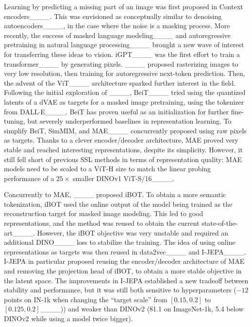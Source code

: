 Learning by predicting a missing part of an image was first proposed in Context encoders____.
This was envisioned as conceptually similar to denoising autoencoders____, in the case where the noise is a masking process.
More recently, the success of masked language modeling____ and autoregressive pretraining in natural language processing____ brought a new wave of interest for transferring these ideas to vision.
iGPT____ was the first effort to train a transformer____ by generating pixels.
____ proposed rasterizing images to very low resolution, then training for autoregressive next-token prediction.
Then, the advent of the ViT____ architecture sparked further interest in the field.
Following the initial exploration of ____, BeiT____ tried using the quantized latents of a dVAE as targets for a masked image pretraining, using the tokenizer from DALL$\cdot$E____.
BeiT has proven useful as an initialization for further fine-tuning, but severely underperformed baselines in representation learning.
To simplify BeiT, SimMIM, and MAE____ concurrently proposed using raw pixels as targets. 
Thanks to a clever encoder/decoder architecture, MAE proved very stable and reached interesting representations, despite its simplicity.
However, it still fell short of previous SSL methods in terms of representation quality: MAE models need to be scaled to a ViT-H size to match the linear probing performance of a $25\times$ smaller DINOv1 ViT-S/16____.

Concurrently to MAE, ____ proposed iBOT. To obtain a more semantic tokenization, iBOT used the online output of the model being trained as the reconstruction target for masked image modeling.
This led to good representations, and the method was reused to obtain the current state-of-the-art____.
However, the iBOT objective was very unstable and required an additional DINO____ loss to stabilize the training.
The idea of using online representations as targets was then reused in data2vec____ and I-JEPA____.
I-JEPA in particular proposed reusing the encoder/decoder architecture of MAE and removing the projection head of iBOT, to obtain a more stable objective in the latent space.
The improvements in I-JEPA established a new tradeoff between stability and performance, but it was still both sensitive to hyperparameters ($-12$ points on IN-1k when changing the ``target scale''  from $[0.15,0.2]$ to $[0.125,0.2]$____)) and weaker than DINOv2 (81.1 on ImageNet-1k, 5.4 below DINOv2 while using a model twice bigger).

